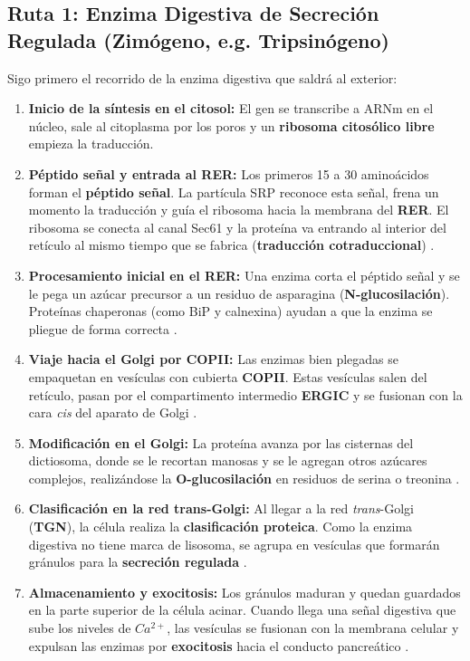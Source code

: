 \documentclass[12pt,spanish,letterpaper,oneside]{article}
\begin{document}
\subsection{Ruta 1: Enzima Digestiva de Secreción Regulada (Zimógeno, e.g. Tripsinógeno)}
Sigo primero el recorrido de la enzima digestiva que saldrá al exterior:
\begin{enumerate}
    \item \textbf{Inicio de la síntesis en el citosol:} El gen se transcribe a ARNm en el núcleo, sale al citoplasma por los poros y un \textbf{ribosoma citosólico libre} empieza la traducción.
    \item \textbf{Péptido señal y entrada al RER:} Los primeros 15 a 30 aminoácidos forman el \textbf{péptido señal}. La partícula SRP reconoce esta señal, frena un momento la traducción y guía el ribosoma hacia la membrana del \textbf{RER}. El ribosoma se conecta al canal Sec61 y la proteína va entrando al interior del retículo al mismo tiempo que se fabrica (\textbf{traducción cotraduccional}) \parencite{salazar2018biologia, alberts2022molecular}.
    \item \textbf{Procesamiento inicial en el RER:} Una enzima corta el péptido señal y se le pega un azúcar precursor a un residuo de asparagina (\textbf{N-glucosilación}). Proteínas chaperonas (como BiP y calnexina) ayudan a que la enzima se pliegue de forma correcta \parencite{mathews2013bioquimica}.
    \item \textbf{Viaje hacia el Golgi por COPII:} Las enzimas bien plegadas se empaquetan en vesículas con cubierta \textbf{COPII}. Estas vesículas salen del retículo, pasan por el compartimento intermedio \textbf{ERGIC} y se fusionan con la cara \textit{cis} del aparato de Golgi \parencite{fortoul2020histologia, lodish2021molecular}.
    \item \textbf{Modificación en el Golgi:} La proteína avanza por las cisternas del dictiosoma, donde se le recortan manosas y se le agregan otros azúcares complejos, realizándose la \textbf{O-glucosilación} en residuos de serina o treonina \parencite{mathews2013bioquimica, kierszenbaum2020histologia}.
    \item \textbf{Clasificación en la red trans-Golgi:} Al llegar a la red \textit{trans}-Golgi (\textbf{TGN}), la célula realiza la \textbf{clasificación proteica}. Como la enzima digestiva no tiene marca de lisosoma, se agrupa en vesículas que formarán gránulos para la \textbf{secreción regulada} \parencite{alberts2022molecular}.
    \item \textbf{Almacenamiento y exocitosis:} Los gránulos maduran y quedan guardados en la parte superior de la célula acinar. Cuando llega una señal digestiva que sube los niveles de $Ca^{2+}$, las vesículas se fusionan con la membrana celular y expulsan las enzimas por \textbf{exocitosis} hacia el conducto pancreático \parencite{kierszenbaum2020histologia, karp2019biologia}.
\end{enumerate}
\end{document}
